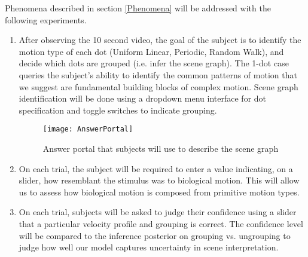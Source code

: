 \documentclass{scrartcl}
\begin{document}
Phenomena described in section \ref{Phenomena} will be addressed with the following experiments.

\begin{enumerate}
  \item After observing the 10 second video, the goal of the subject is to identify the motion type of each dot (Uniform Linear, Periodic, Random Walk), and decide which dots are grouped (i.e. infer the scene graph). The 1-dot case queries the subject's ability to identify the common patterns of motion that we suggest are fundamental building blocks of complex motion. Scene graph identification will be done using a dropdown menu interface for dot specification and toggle switches to indicate grouping.

\begin{figure}[h]
    \centering
    \texttt{[image: AnswerPortal]}
    \caption{Answer portal that subjects will use to describe the scene graph}
    \label{fig:answerportal}
\end{figure}

  \item On each trial, the subject will be required to enter a value indicating, on a slider, how resemblant the stimulus was to biological motion. This will allow us to assess how biological motion is composed from primitive motion types. 
  \item On each trial, subjects will be asked to judge their confidence using a slider that a particular velocity profile and grouping is correct. The confidence level will be compared to the inference posterior on grouping vs. ungrouping to judge how well our model captures uncertainty in scene interpretation. 
\end{enumerate}
\end{document}
